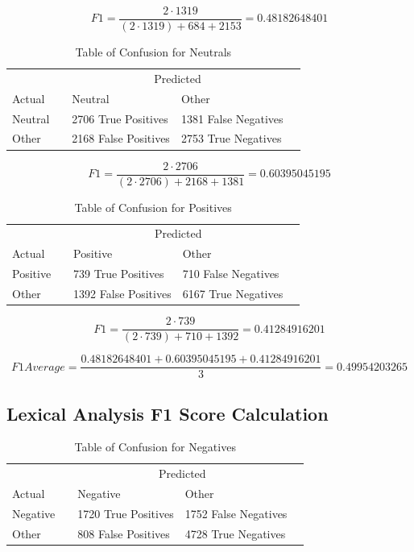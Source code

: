 \[F1 = \dfrac{2\cdot1319}{(2\cdot1319) + 684 + 2153} = 0.48182648401\]


\begin{table}[H]
	\begin{tabular}{@{}lllll@{}}
		\toprule
		& & \multicolumn{2}{c}{Predicted} \\\cmidrule{2-4}
		Actual & & Neutral & Other & \\ \midrule
		Neutral & & 2706 True Positives & 1381 False Negatives & \\
		Other  & & 2168 False Positives & 2753 True Negatives & \\ \bottomrule
	\end{tabular}
	\centering
	\caption{Table of Confusion for Neutrals}
	\label{rbneu}
\end{table}

\[F1 = \dfrac{2\cdot2706}{(2\cdot2706) + 2168 + 1381} = 0.60395045195\]


\begin{table}[H]
	\begin{tabular}{@{}lllll@{}}
		\toprule
		& & \multicolumn{2}{c}{Predicted} \\\cmidrule{2-4}
		Actual & & Positive & Other & \\ \midrule
		Positive & & 739 True Positives & 710 False Negatives & \\
		Other  & & 1392 False Positives & 6167 True Negatives & \\ \bottomrule
	\end{tabular}
	\centering
	\caption{Table of Confusion for Positives}
	\label{rbpos}
\end{table}


\[F1 = \dfrac{2\cdot739}{(2\cdot739) + 710 + 1392} = 0.41284916201\]

\[F1 Average = \dfrac{0.48182648401+0.60395045195+0.41284916201}{3} = 0.49954203265\]

\subsection{Lexical Analysis F1 Score Calculation}

\begin{table}[H]
	\begin{tabular}{@{}lllll@{}}
		\toprule
		& & \multicolumn{2}{c}{Predicted} \\\cmidrule{2-4}
		Actual & & Negative & Other & \\ \midrule
		Negative & & 1720 True Positives & 1752 False Negatives & \\
		Other  & & 808 False Positives & 4728 True Negatives & \\ \bottomrule
	\end{tabular}
	\centering
	\caption{Table of Confusion for Negatives}
	\label{rbneg}
\end{table}

